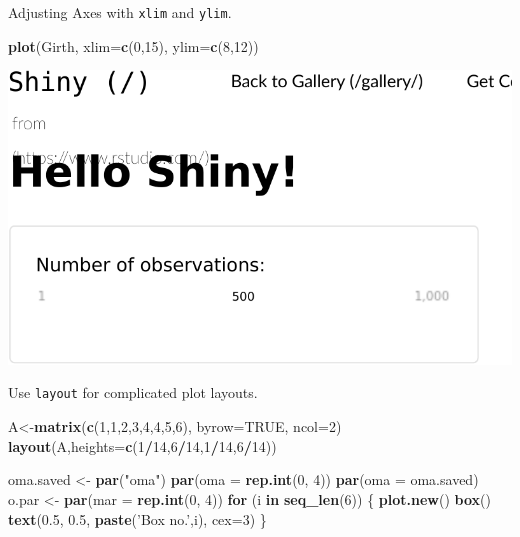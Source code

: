 \documentclass[]{book}
\newenvironment{Shaded}{\begin{snugshade}}{\end{snugshade}}
\newcommand{\ControlFlowTok}[1]{\textcolor[rgb]{0.13,0.29,0.53}{\textbf{#1}}}
\newcommand{\DataTypeTok}[1]{\textcolor[rgb]{0.13,0.29,0.53}{#1}}
\newcommand{\DecValTok}[1]{\textcolor[rgb]{0.00,0.00,0.81}{#1}}
\newcommand{\FloatTok}[1]{\textcolor[rgb]{0.00,0.00,0.81}{#1}}
\newcommand{\KeywordTok}[1]{\textcolor[rgb]{0.13,0.29,0.53}{\textbf{#1}}}
\newcommand{\NormalTok}[1]{#1}
\newcommand{\OperatorTok}[1]{\textcolor[rgb]{0.81,0.36,0.00}{\textbf{#1}}}
\newcommand{\OtherTok}[1]{\textcolor[rgb]{0.56,0.35,0.01}{#1}}
\newcommand{\StringTok}[1]{\textcolor[rgb]{0.31,0.60,0.02}{#1}}
\theoremstyle{definition}
\theoremstyle{definition}
\theoremstyle{definition}
\theoremstyle{remark}
\begin{document}
Adjusting Axes with \texttt{xlim} and \texttt{ylim}.

\begin{Shaded}
\begin{Highlighting}[]
\KeywordTok{plot}\NormalTok{(Girth, }\DataTypeTok{xlim=}\KeywordTok{c}\NormalTok{(}\DecValTok{0}\NormalTok{,}\DecValTok{15}\NormalTok{), }\DataTypeTok{ylim=}\KeywordTok{c}\NormalTok{(}\DecValTok{8}\NormalTok{,}\DecValTok{12}\NormalTok{))}
\end{Highlighting}
\end{Shaded}

\includegraphics[width=0.5\linewidth]{Rcourse_files/figure-latex/unnamed-chunk-254-1}

Use \texttt{layout} for complicated plot layouts.

\begin{Shaded}
\begin{Highlighting}[]
\NormalTok{A<-}\KeywordTok{matrix}\NormalTok{(}\KeywordTok{c}\NormalTok{(}\DecValTok{1}\NormalTok{,}\DecValTok{1}\NormalTok{,}\DecValTok{2}\NormalTok{,}\DecValTok{3}\NormalTok{,}\DecValTok{4}\NormalTok{,}\DecValTok{4}\NormalTok{,}\DecValTok{5}\NormalTok{,}\DecValTok{6}\NormalTok{), }\DataTypeTok{byrow=}\OtherTok{TRUE}\NormalTok{, }\DataTypeTok{ncol=}\DecValTok{2}\NormalTok{)}
\KeywordTok{layout}\NormalTok{(A,}\DataTypeTok{heights=}\KeywordTok{c}\NormalTok{(}\DecValTok{1}\OperatorTok{/}\DecValTok{14}\NormalTok{,}\DecValTok{6}\OperatorTok{/}\DecValTok{14}\NormalTok{,}\DecValTok{1}\OperatorTok{/}\DecValTok{14}\NormalTok{,}\DecValTok{6}\OperatorTok{/}\DecValTok{14}\NormalTok{))}

\NormalTok{oma.saved <-}\StringTok{ }\KeywordTok{par}\NormalTok{(}\StringTok{"oma"}\NormalTok{)}
\KeywordTok{par}\NormalTok{(}\DataTypeTok{oma =} \KeywordTok{rep.int}\NormalTok{(}\DecValTok{0}\NormalTok{, }\DecValTok{4}\NormalTok{))}
\KeywordTok{par}\NormalTok{(}\DataTypeTok{oma =}\NormalTok{ oma.saved)}
\NormalTok{o.par <-}\StringTok{ }\KeywordTok{par}\NormalTok{(}\DataTypeTok{mar =} \KeywordTok{rep.int}\NormalTok{(}\DecValTok{0}\NormalTok{, }\DecValTok{4}\NormalTok{))}
\ControlFlowTok{for}\NormalTok{ (i }\ControlFlowTok{in} \KeywordTok{seq_len}\NormalTok{(}\DecValTok{6}\NormalTok{)) \{}
    \KeywordTok{plot.new}\NormalTok{()}
    \KeywordTok{box}\NormalTok{()}
    \KeywordTok{text}\NormalTok{(}\FloatTok{0.5}\NormalTok{, }\FloatTok{0.5}\NormalTok{, }\KeywordTok{paste}\NormalTok{(}\StringTok{'Box no.'}\NormalTok{,i), }\DataTypeTok{cex=}\DecValTok{3}\NormalTok{)}
\NormalTok{\}}
\end{Highlighting}
\end{Shaded}
\end{document}
